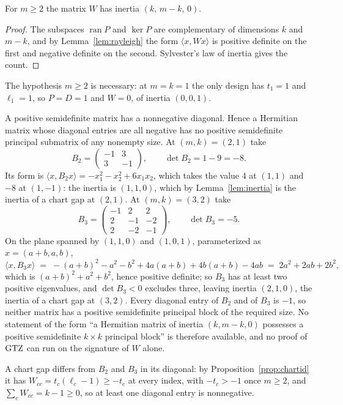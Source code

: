 \begin{lemma}\label{lem:inertia}
For $m\ge2$ the matrix $W$ has inertia $(k,\,m-k,\,0)$.
\end{lemma}

\begin{proof}
The subspaces $\operatorname{ran}P$ and $\ker P$ are complementary of
dimensions $k$ and $m-k$, and by Lemma~\ref{lem:rayleigh} the form
$\langle x,Wx\rangle$ is positive definite on the first and negative
definite on the second.  Sylvester's law of inertia
\cite[\S4.5]{HornJohnson2013} gives the count.
\end{proof}

The hypothesis $m\ge2$ is necessary: at $m=k=1$ the only design has
$t_1=1$ and $\ell_1=1$, so $P=D=1$ and $W=0$, of inertia $(0,0,1)$.

\begin{remark}[Lean]\label{rem:nogo}
A positive semidefinite matrix has a nonnegative diagonal.  Hence a
Hermitian matrix whose diagonal entries are all negative has no positive
semidefinite principal submatrix of any nonempty size.  At $(m,k)=(2,1)$
take
\[
  B_2=\begin{pmatrix}-1&3\\3&-1\end{pmatrix},
  \qquad \det B_2=1-9=-8 .
\]
Its form is $\langle x,B_2x\rangle=-x_1^2-x_2^2+6x_1x_2$, which takes the
value $4$ at $(1,1)$ and $-8$ at $(1,-1)$: the inertia is $(1,1,0)$,
which by Lemma~\ref{lem:inertia} is the inertia of a chart gap at
$(2,1)$.  At $(m,k)=(3,2)$ take
\[
  B_3=\begin{pmatrix}-1&2&2\\2&-1&-2\\2&-2&-1\end{pmatrix},
  \qquad \det B_3=-5 .
\]
On the plane spanned by $(1,1,0)$ and $(1,0,1)$, parameterized as
$x=(a+b,a,b)$,
\[
  \langle x,B_3x\rangle
  \;=\;-(a+b)^2-a^2-b^2+4a(a+b)+4b(a+b)-4ab
  \;=\;2a^2+2ab+2b^2,
\]
which is $(a+b)^2+a^2+b^2$, hence positive definite; so $B_3$ has at
least two positive eigenvalues, and $\det B_3<0$ excludes three, leaving
inertia $(2,1,0)$, the inertia of a chart gap at $(3,2)$.  Every diagonal
entry of $B_2$ and of $B_3$ is $-1$, so neither matrix has a positive
semidefinite principal block of the required size.  No statement of the
form ``a Hermitian matrix of inertia $(k,m-k,0)$ possesses a positive
semidefinite $k\times k$ principal block'' is therefore available, and no
proof of $\mathrm{GTZ}$ can run on the signature of $W$ alone.

A chart gap differs from $B_2$ and $B_3$ in its diagonal: by
Proposition~\ref{prop:chartid} it has $W_{cc}=t_c(\ell_c-1)\ge-t_c$ at
every index, with $-t_c>-1$ once $m\ge2$, and $\sum_cW_{cc}=k-1\ge0$, so
at least one diagonal entry is nonnegative.
\end{remark}

